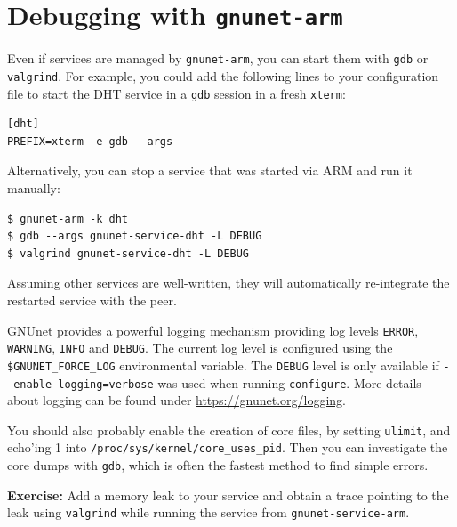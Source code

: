 \documentclass[10pt]{article}
\newcommand{\exercise}[1]{\noindent\begin{boxedminipage}{\textwidth}{\bf Exercise:} #1 \end{boxedminipage}}
\begin{document}
\section{Debugging with {\tt gnunet-arm}}

Even if services are managed by {\tt gnunet-arm}, you can start them with
{\tt gdb} or {\tt valgrind}.  For example, you could add the following lines
to your configuration file to start the DHT service in a {\tt gdb} session in a
fresh {\tt xterm}:

\begin{verbatim}
[dht]
PREFIX=xterm -e gdb --args
\end{verbatim}

Alternatively, you can stop a service that was started via ARM and run it manually:

\lstset{language=bash}
\begin{lstlisting}
$ gnunet-arm -k dht
$ gdb --args gnunet-service-dht -L DEBUG
$ valgrind gnunet-service-dht -L DEBUG
\end{lstlisting}

Assuming other services are well-written, they will automatically re-integrate the
restarted service with the peer.

GNUnet provides a powerful logging mechanism providing log levels \texttt{ERROR},
\texttt{WARNING}, \texttt{INFO} and \texttt{DEBUG}. The current log level is
configured using the \lstinline|$GNUNET_FORCE_LOG| environmental variable.
The \texttt{DEBUG} level is only available if \lstinline|--enable-logging=verbose| was used when
running \texttt{configure}. More details about logging can be found under
\url{https://gnunet.org/logging}.

You should also probably enable the creation of core files, by setting
{\tt ulimit}, and echo'ing 1 into {\tt /proc/sys/kernel/core\_uses\_pid}.
Then you can investigate the core dumps with {\tt gdb}, which is often
the fastest method to find simple errors.

\exercise{Add a memory leak to your service and obtain a trace
pointing to the leak using {\tt valgrind} while running the service
from {\tt gnunet-service-arm}.}
\end{document}
